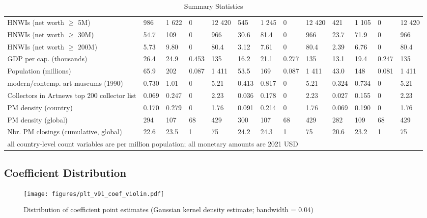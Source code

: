 \documentclass[11pt]{article}
\begin{document}
\begin{landscape}
\begin{table}[ht]
\begin{tabular}{p{7cm}llllllllllll}
  HNWIs (net worth $\geq$ 5M) & 986 & 1 622 & 0 & 12 420 & 545 & 1 245 & 0 & 12 420 & 421 & 1 105 & 0 & 12 420 \\ 
  HNWIs (net worth $\geq$ 30M) & 54.7 & 109 & 0 & 966 & 30.6 & 81.4 & 0 & 966 & 23.7 & 71.9 & 0 & 966 \\ 
  HNWIs (net worth $\geq$ 200M) & 5.73 & 9.80 & 0 & 80.4 & 3.12 & 7.61 & 0 & 80.4 & 2.39 & 6.76 & 0 & 80.4 \\ 
  GDP per cap. (thousands) & 26.4 & 24.9 & 0.453 & 135 & 16.2 & 21.1 & 0.277 & 135 & 13.1 & 19.4 & 0.247 & 135 \\ 
  Population (millions) & 65.9 & 202 & 0.087 & 1 411 & 53.5 & 169 & 0.087 & 1 411 & 43.0 & 148 & 0.081 & 1 411 \\ 
  modern/contemp. art museums (1990) & 0.730 & 1.01 & 0 & 5.21 & 0.413 & 0.817 & 0 & 5.21 & 0.324 & 0.734 & 0 & 5.21 \\ 
  Collectors in Artnews top 200 collector list & 0.069 & 0.247 & 0 & 2.23 & 0.036 & 0.178 & 0 & 2.23 & 0.027 & 0.155 & 0 & 2.23 \\ 
  PM density (country) & 0.170 & 0.279 & 0 & 1.76 & 0.091 & 0.214 & 0 & 1.76 & 0.069 & 0.190 & 0 & 1.76 \\ 
  PM density (global) & 294 & 107 & 68 & 429 & 300 & 107 & 68 & 429 & 282 & 109 & 68 & 429 \\ 
  Nbr. PM closings (cumulative, global) & 22.6 & 23.5 & 1 & 75 & 24.2 & 24.3 & 1 & 75 & 20.6 & 23.2 & 1 & 75 \\ 
   \hline \multicolumn{13}{l}{\footnotesize{all country-level count variables are per million population; all monetary amounts are 2021 USD}}
\end{tabular}
\caption{Summary Statistics} 
\label{tbl:descs}
\end{table}
\end{landscape}




\subsection{Coefficient Distribution}
\label{app_coefdrbn}
\begin{figure}[htbp]
\centering
\texttt{[image: figures/plt\_v91\_coef\_violin.pdf]}
\caption{\label{fig:coef_violin}Distribution of coefficient point estimates (Gaussian kernel density estimate; bandwidth = 0.04)}
\end{figure}

\FloatBarrier
\end{document}
